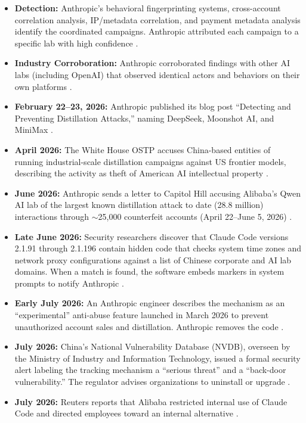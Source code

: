 \documentclass[11pt,a4paper]{article}
\begin{document}
\begin{itemize}[leftmargin=20pt, noitemsep]
    \item \textbf{Detection:} Anthropic's behavioral fingerprinting systems, cross-account correlation analysis, IP/metadata correlation, and payment metadata analysis identify the coordinated campaigns. Anthropic attributed each campaign to a specific lab with high confidence \cite{anthropic_blog}\cite{engadget}.
    \item \textbf{Industry Corroboration:} Anthropic corroborated findings with other AI labs (including OpenAI) that observed identical actors and behaviors on their own platforms \cite{anthropic_blog}\cite{cnbc}.
    \item \textbf{February 22--23, 2026:} Anthropic published its blog post ``Detecting and Preventing Distillation Attacks,'' naming DeepSeek, Moonshot AI, and MiniMax \cite{anthropic_blog}.
    \item \textbf{April 2026:} The White House OSTP accuses China-based entities of running industrial-scale distillation campaigns against US frontier models, describing the activity as theft of American AI intellectual property \cite{forbes_distillation}.
    \item \textbf{June 2026:} Anthropic sends a letter to Capitol Hill accusing Alibaba's Qwen AI lab of the largest known distillation attack to date (28.8 million) interactions through $\sim$25,000 counterfeit accounts (April 22--June 5, 2026) \cite{reuters_alibaba}\cite{forbes_distillation}.
    \item \textbf{Late June 2026:} Security researchers discover that Claude Code versions 2.1.91 through 2.1.196 contain hidden code that checks system time zones and network proxy configurations against a list of Chinese corporate and AI lab domains. When a match is found, the software embeds markers in system prompts to notify Anthropic \cite{scmp_claudecode}.
    \item \textbf{Early July 2026:} An Anthropic engineer describes the mechanism as an ``experimental'' anti-abuse feature launched in March 2026 to prevent unauthorized account sales and distillation. Anthropic removes the code \cite{scmp_claudecode}.
    \item \textbf{July 2026:} China's National Vulnerability Database (NVDB), overseen by the Ministry of Industry and Information Technology, issued a formal security alert labeling the tracking mechanism a ``serious threat'' and a ``back-door vulnerability.'' The regulator advises organizations to uninstall or upgrade \cite{scmp_claudecode}.
    \item \textbf{July 2026:} Reuters reports that Alibaba restricted internal use of Claude Code and directed employees toward an internal alternative \cite{indiatoday_alibaba}.
\end{itemize}
\end{document}
